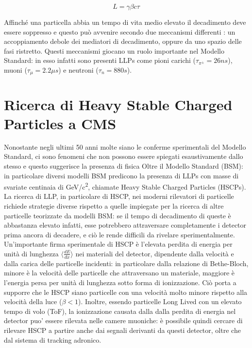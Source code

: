 \begin{equation}
  \label{eq:LorentzBoost}
  L = \gamma \beta c \tau
\end{equation}


Affinché una particella abbia un tempo di vita medio elevato il decadimento deve essere soppresso e questo può avvenire secondo due meccanismi differenti \cite{Genest:2022}: un accoppiamento debole dei mediatori di decadimento, oppure da uno spazio delle fasi ristretto. \newline
Questi meccanismi giocano un ruolo importante nel Modello Standard: in esso infatti sono presenti LLPs come pioni carichi ($\tau_{\pi^\pm} = 26\si{ns}$), muoni ($\tau_{\mu} = 2.2 \si{\mu s}$) e neutroni ($\tau_{n} = 880\si{s}$).

\newpage

\section{Ricerca di Heavy Stable Charged Particles a CMS}
\label{sec:NewPhysics}

Nonostante negli ultimi 50 anni molte siano le conferme sperimentali del Modello Standard, ci sono fenomeni che non possono essere spiegati esaustivamente dallo stesso e questo suggerisce la presenza di fisica Oltre il Modello Standard (BSM): in particolare diversi modelli BSM predicono la presenza di LLPs con masse di svariate centinaia di \si{GeV/c^2}, chiamate Heavy Stable Charged Particles (HSCPs). La ricerca di LLP, in particolare di HSCP, nei moderni rilevatori di particelle richiede strategie diverse rispetto a quelle impiegate per la ricerca di altre particelle teorizzate da modelli BSM: se il tempo di decadimento di queste è abbastanza elevato infatti, esse potrebbero attraversare completamente i detector prima ancora di decadere, e ciò le rende difficili da rivelare sperimentalmente. \newline 
Un'importante firma sperimentale di HSCP è l'elevata perdita di energia per unità di lunghezza $\langle \frac{dE}{dx}\rangle$ nei materiali del detector, dipendente dalla velocità e dalla carica delle particelle incidenti: in particolare dalla relazione di Bethe-Bloch, minore è la velocità delle particelle che attraversano un materiale, maggiore è l'energia persa per unità di lunghezza sotto forma di ionizzazione. Ciò porta a supporre che le HSCP siano particelle con una velocità molto minore rispetto alla velocità della luce ($\beta < 1$). Inoltre, essendo particelle Long Lived con un elevato tempo di volo (ToF), la ionizzazione causata dalla dalla perdita di energia nel detector puo' essere rilevata nelle camere muoniche: è possibile quindi cercare di rilevare HSCP a partire anche dai segnali derivanti da questi detector, oltre che dal sistema di tracking adronico.



